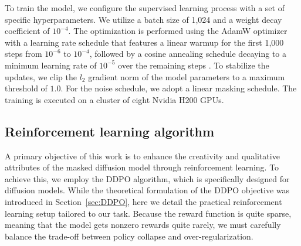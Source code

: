 \begin{algorithm}[H]
    \caption{Supervised pretraining}
    \label{alg:supervised training}
\end{algorithm}

To train the model, we configure the supervised learning process with a set of specific hyperparameters. We utilize a batch size of 1,024 and a weight decay coefficient of $10^{-4}$. The optimization is performed using the AdamW optimizer with a learning rate schedule that features a linear warmup for the first 1,000 steps from $10^{-6}$ to $10^{-4}$, followed by a cosine annealing schedule decaying to a minimum learning rate of $10^{-5}$ over the remaining steps \cite{loshchilov2017sgdr}. To stabilize the updates, we clip the $l_2$ gradient norm of the model parameters to a maximum threshold of $1.0$. For the noise schedule, we adopt a linear masking schedule. The training is executed on a cluster of eight Nvidia H200 GPUs.




\subsection{Reinforcement learning algorithm}
\label{sec:Reinforcement learning algorithm}


A primary objective of this work is to enhance the creativity and qualitative attributes of the masked diffusion model through reinforcement learning. To achieve this, we employ the DDPO algorithm, which is specifically designed for diffusion models. While the theoretical formulation of the DDPO objective was introduced in Section~\ref{sec:DDPO}, here we detail the practical reinforcement learning setup tailored to our task. Because the reward function is quite sparse, meaning that the model gets nonzero rewards quite rarely, we must carefully balance the trade-off between policy collapse and over-regularization.

